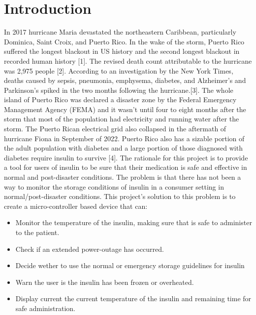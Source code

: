 \chapter{Introduction}
In 2017 hurricane Maria devastated the northeastern Caribbean, particularly Dominica, Saint Croix, and Puerto Rico. In the wake of the storm, Puerto Rico suffered the longest blackout in US history and the second longest blackout in recorded human history [1]. The revised death count attributable to the hurricane was 2,975 people [2]. According to an investigation by the New York Times, deaths caused by  sepsis, pneumonia, emphysema, diabetes, and Alzheimer's and Parkinson's spiked in the two months following the hurricane.[3]. The whole island of Puerto Rico was declared a disaster zone by the Federal Emergency Management Agency (FEMA) and it wasn't until four to eight months after the storm that most of the population had electricity and running water after the storm. The Puerto Rican electrical grid also collapsed in the aftermath of hurricane Fiona in September of 2022. Puerto Rico also has a sizable portion of the adult population with diabetes and a large portion of those diagnosed with diabetes require insulin to survive [4]. The rationale for this project is to provide a tool for users of insulin to be sure that their medication is safe and effective in normal and post-disaster conditions. The problem is that there has not been a way to monitor the storage conditions of insulin in a consumer setting in normal/post-disaster conditions. This project's solution to this problem is to create a micro-controller based device that can:
\begin{itemize}
  \item Monitor the temperature of the insulin, making sure that is safe to administer to the patient.
  \item Check if an extended power-outage has occurred.
  \item Decide wether to use the normal or emergency storage guidelines for insulin
  \item Warn the user is the insulin has been frozen or overheated.
  \item Display current the current temperature of the insulin and remaining time for safe administration.
\end{itemize}
